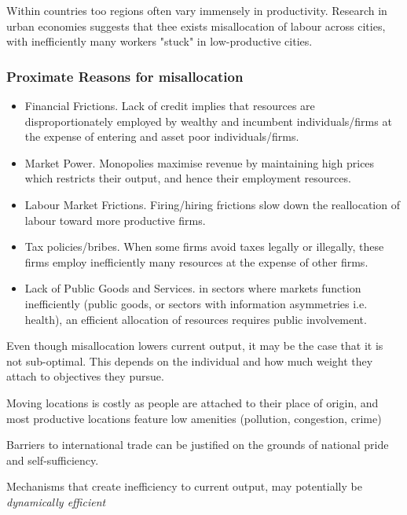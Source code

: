 \documentclass[11pt]{article}
\begin{document}
Within countries too regions often vary immensely in productivity. Research in urban economies suggests that thee exists misallocation of labour across cities, with inefficiently many workers "stuck" in low-productive cities.
\begin{shaded}
    \subsubsection{Proximate Reasons for misallocation}
    \begin{itemize}
    \item Financial Frictions. Lack of credit implies that resources are disproportionately employed by wealthy and incumbent individuals/firms at the expense of entering and asset poor individuals/firms.

    \item Market Power. Monopolies maximise revenue by maintaining high prices which restricts their output, and hence their employment resources.

    \item Labour Market Frictions. Firing/hiring frictions slow down the reallocation of labour toward more productive firms.

    \item Tax policies/bribes. When some firms avoid taxes legally or illegally, these firms employ inefficiently many resources at the expense of other firms.

    \item Lack of Public Goods and Services. in sectors where markets function inefficiently (public goods, or sectors with information asymmetries i.e. health), an efficient allocation of resources requires public involvement.
\end{itemize}
\end{shaded}

\begin{mdframed}
    \begin{note}
    Even though misallocation lowers current output, it may be the case that it is not sub-optimal. This depends on the individual and how much weight they attach to objectives they pursue.

    Moving locations is costly as people are attached to their place of origin, and most productive locations feature low amenities (pollution, congestion, crime)

    Barriers to international trade can be justified on the grounds of national pride and self-sufficiency.

    Mechanisms that create inefficiency to current output, may potentially be \textit{dynamically efficient}
\end{note}
\end{mdframed}
\end{document}
